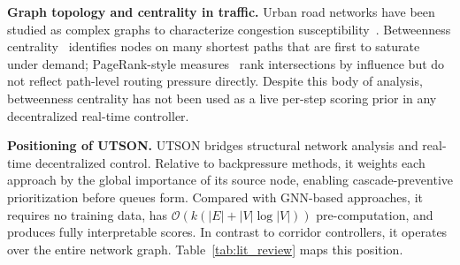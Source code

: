 \documentclass[letterpaper, conference]{IEEEtran}
\begin{document}
\textbf{Graph topology and centrality in traffic.}
Urban road networks have been studied as complex graphs to characterize congestion susceptibility~\cite{newman2010networks, wang2015graph}. Betweenness centrality~\cite{freeman1977set, brandes2001centrality} identifies nodes on many shortest paths that are first to saturate under demand; PageRank-style measures~\cite{pagerank2016centrality} rank intersections by influence but do not reflect path-level routing pressure directly. Despite this body of analysis, betweenness centrality has not been used as a live per-step scoring prior in any decentralized real-time controller.

\textbf{Positioning of UTSON.}
UTSON bridges structural network analysis and real-time decentralized control. Relative to backpressure methods, it weights each approach by the global importance of its source node, enabling cascade-preventive prioritization before queues form. Compared with GNN-based approaches, it requires no training data, has $\mathcal{O}(k(|E|+|V|\log|V|))$ pre-computation, and produces fully interpretable scores. In contrast to corridor controllers, it operates over the entire network graph. Table~\ref{tab:lit_review} maps this position.
\end{document}

